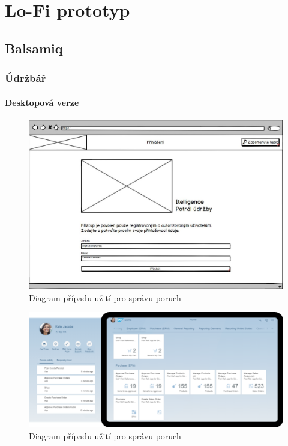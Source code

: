 \documentclass[thesis=M,czech]{FITthesis}[2012/06/26]
\begin{document}
\section{Lo-Fi prototyp}

\subsection{Balsamiq}

\subsubsection{Údržbář}

\paragraph{Desktopová verze}

\begin{figure}[H]
	\centering
	\includegraphics[width=1\textwidth]{images/bal_login}
	\caption{Diagram případu užití pro správu poruch}
	\label{img:uc_sprava_poruch}
\end{figure}

\begin{figure}[H]
	\centering
	\includegraphics[width=1\textwidth]{images/fiori_launchpad}
	\caption{Diagram případu užití pro správu poruch}
	\label{img:uc_sprava_poruch}
\end{figure}
\end{document}
